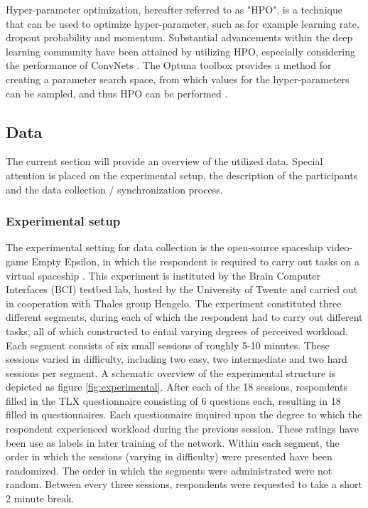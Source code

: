 \documentclass[12pt]{article}
\begin{document}
Hyper-parameter optimization, hereafter referred to as "HPO", is a technique that can be used to optimize hyper-parameter, such as for example learning rate, dropout probability and momentum. Substantial advancements within the deep learning community have been attained by utilizing HPO, especially considering the performance of ConvNets \cite{bergstra2012random}. The Optuna toolbox provides a method for creating a parameter search space, from which values for the hyper-parameters can be sampled, and thus HPO can be performed \cite{akiba2019optuna}. 

\subsection{Data}
The current section will provide an overview of the utilized data. Special attention is placed on the experimental setup, the description of the participants and the data collection / synchronization process. 

\subsubsection{Experimental setup}
The experimental setting for data collection is the open-source spaceship video-game Empty Epsilon, in which the respondent is required to carry out tasks on a virtual spaceship \cite{daid2016empty}. This experiment is instituted by the Brain Computer Interfaces (BCI) testbed lab, hosted by the University of Twente and carried out in cooperation with Thales group Hengelo. The experiment constituted three different segments, during each of which the respondent had to carry out different tasks, all of which constructed to entail varying degrees of perceived workload. Each segment consists of six small sessions of roughly 5-10 minutes. These sessions varied in difficulty, including two easy, two intermediate and two hard sessions per segment. A schematic overview of the experimental structure is depicted as figure \ref{fig:experimental}. After each of the 18 sessions, respondents filled in the TLX questionnaire consisting of 6 questions each, resulting in 18 filled in questionnaires. Each questionnaire inquired upon the degree to which the respondent experienced workload during the previous session. These ratings have been use as labels in later training of the network. Within each segment, the order in which the sessions (varying in difficulty) were presented have been randomized. The order in which the segments were administrated were not random. Between every three sessions, respondents were requested to take a short 2 minute break.
\end{document}
